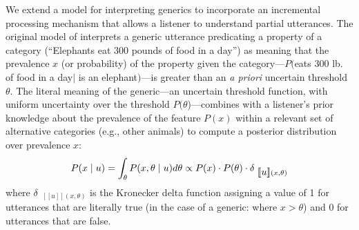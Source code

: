 \documentclass[10pt,letterpaper]{article}
\newcommand{\denote}[1]{\mbox{ $[\![ #1 ]\!]$}}
\begin{document}
We extend a model for interpreting generics to incorporate an incremental processing mechanism that allows a listener to understand partial utterances.
The original model of  interprets a generic utterance predicating a property of a category (``Elephants eat 300 pounds of food in a day'') as meaning that the prevalence $x$ (or probability) of the property given the category---$P($eats 300 lb. of food in a day$\mid$ is an elephant$)$---is greater than an \emph{a priori} uncertain threshold $\theta$.
The literal meaning of the generic---an uncertain threshold function, with uniform uncertainty over the threshold $P(\theta$)---combines with a listener's prior knowledge about the prevalence of the feature $P(x)$ within a relevant set of alternative categories (e.g., other animals) to compute a posterior distribution over prevalence $x$:
%
\vspace{-0.2cm}
\begin{equation}
P(x \mid u) = \int_{\theta} P(x, \theta \mid u)  d\theta \propto P(x) \cdot P(\theta) \cdot \delta_{\denote{u}(x, \theta)} 
\label{eq:L0}
\vspace{-0.15cm}
\end{equation}
\noindent where $\delta_{\denote{u}(x, \theta)}$ is the Kronecker delta function assigning a value of 1 for utterances that are literally true (in the case of a generic: where $x > \theta$) and 0 for utterances that are false.
\end{document}
